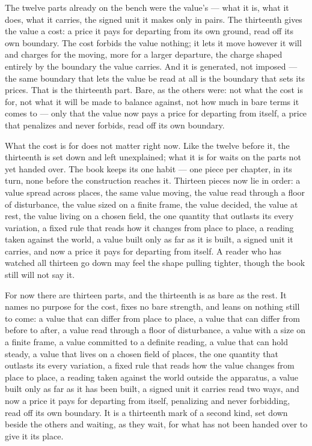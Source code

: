 The twelve parts already on the bench were the value's --- what it is, what it does, what it carries, the signed unit it makes only in pairs. The thirteenth gives the value a cost: a price it pays for departing from its own ground, read off its own boundary. The cost forbids the value nothing; it lets it move however it will and charges for the moving, more for a larger departure, the charge shaped entirely by the boundary the value carries. And it is generated, not imposed --- the same boundary that lets the value be read at all is the boundary that sets its prices. That is the thirteenth part. Bare, as the others were: not what the cost is for, not what it will be made to balance against, not how much in bare terms it comes to --- only that the value now pays a price for departing from itself, a price that penalizes and never forbids, read off its own boundary.

What the cost is for does not matter right now. Like the twelve before it, the thirteenth is set down and left unexplained; what it is for waits on the parts not yet handed over. The book keeps its one habit --- one piece per chapter, in its turn, none before the construction reaches it. Thirteen pieces now lie in order: a value spread across places, the same value moving, the value read through a floor of disturbance, the value sized on a finite frame, the value decided, the value at rest, the value living on a chosen field, the one quantity that outlasts its every variation, a fixed rule that reads how it changes from place to place, a reading taken against the world, a value built only as far as it is built, a signed unit it carries, and now a price it pays for departing from itself. A reader who has watched all thirteen go down may feel the shape pulling tighter, though the book still will not say it.

For now there are thirteen parts, and the thirteenth is as bare as the rest. It names no purpose for the cost, fixes no bare strength, and leans on nothing still to come: a value that can differ from place to place, a value that can differ from before to after, a value read through a floor of disturbance, a value with a size on a finite frame, a value committed to a definite reading, a value that can hold steady, a value that lives on a chosen field of places, the one quantity that outlasts its every variation, a fixed rule that reads how the value changes from place to place, a reading taken against the world outside the apparatus, a value built only as far as it has been built, a signed unit it carries read two ways, and now a price it pays for departing from itself, penalizing and never forbidding, read off its own boundary. It is a thirteenth mark of a second kind, set down beside the others and waiting, as they wait, for what has not been handed over to give it its place.
